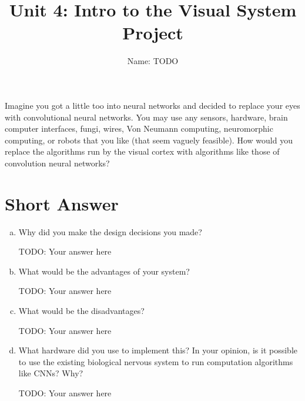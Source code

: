 \documentclass[letterpaper,11pt]{article}
\begin{document}
\title{{\bf Unit 4: Intro to the Visual System Project} }
\author{Name: TODO}

\date{}
\maketitle

Imagine you got a little too into neural networks and decided to replace your eyes with convolutional neural networks. You may use any sensors, hardware, brain computer interfaces, fungi, wires, Von Neumann computing, neuromorphic computing, or robots that you like (that seem vaguely feasible). How would you replace the algorithms run by the visual cortex with algorithms like those of convolution neural networks? 

\section*{Short Answer}
\begin{enumerate}[a)]
\item Why did you make the design decisions you made?

\begin{tcolorbox}
TODO: Your answer here
\end{tcolorbox}

\item What would be the advantages of your system? 

\begin{tcolorbox}
TODO: Your answer here
\end{tcolorbox}

\item What would be the disadvantages?

\begin{tcolorbox}
TODO: Your answer here
\end{tcolorbox}

\item What hardware did you use to implement this? In your opinion, is it possible to use the existing biological nervous system to run computation algorithms like CNNs? Why?

\begin{tcolorbox}
TODO: Your answer here
\end{tcolorbox}
    
\end{enumerate}
\end{document}
